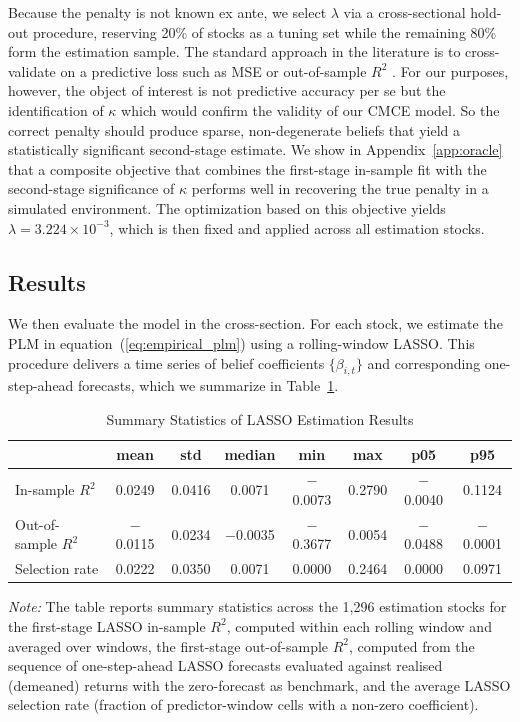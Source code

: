 Because the penalty is not known ex ante, we select $\lambda$ via a cross-sectional hold-out procedure, reserving 20\% of stocks as a tuning set while the remaining 80\% form the estimation sample.
The standard approach in the literature is to cross-validate on a predictive loss such as MSE or out-of-sample $R^2$ \citep{Chinco2019, Gu2020, Feng2020}.
For our purposes, however, the object of interest is not predictive accuracy per se but the identification of $\kappa$ which would confirm the validity of our CMCE model.
So the correct penalty should produce sparse, non-degenerate beliefs that yield a statistically significant second-stage estimate.
We show in Appendix~\ref{app:oracle} that a composite objective that combines the first-stage in-sample fit with the second-stage significance of $\kappa$ performs well in recovering the true penalty in a simulated environment.
The optimization based on this objective yields $\lambda = 3.224 \times 10^{-3}$, which is then fixed and applied across all estimation stocks.


\subsection{Results}

We then evaluate the model in the cross-section.
For each stock, we estimate the PLM in equation~(\ref{eq:empirical_plm}) using a rolling-window LASSO.
This procedure delivers a time series of belief coefficients $\{\beta_{i,t}\}$ and corresponding one-step-ahead forecasts, which we summarize in Table~\ref{tab:summary_stats_lasso}.

\begin{table}[H]
\centering
\caption{Summary Statistics of LASSO Estimation Results}
\label{tab:summary_stats_lasso}
\begin{tabularx}{\textwidth}{@{}>{\small}Xccccccc@{}}
\toprule
 & mean & std & median & min & max & p05 & p95 \\
\midrule
In-sample $R^2$   & 0.0249 & 0.0416 & 0.0071 & $-$0.0073 & 0.2790 & $-$0.0040 & 0.1124 \\
Out-of-sample $R^2$ & $-$0.0115 & 0.0234 & $-$0.0035 & $-$0.3677 & 0.0054 & $-$0.0488 & $-$0.0001 \\
Selection rate    & 0.0222 & 0.0350 & 0.0071 & 0.0000 & 0.2464 & 0.0000 & 0.0971 \\
\bottomrule
\end{tabularx}
\medskip
\begin{minipage}{\textwidth}
\footnotesize
\textit{Note:} The table reports summary statistics across the 1,296 estimation stocks for the first-stage LASSO in-sample $R^2$, computed within each rolling window and averaged over windows, the first-stage out-of-sample $R^2$, computed from the sequence of one-step-ahead LASSO forecasts evaluated against realised (demeaned) returns with the zero-forecast as benchmark, and the average LASSO selection rate (fraction of predictor-window cells with a non-zero coefficient).
\end{minipage}
\end{table}

